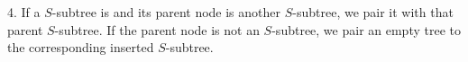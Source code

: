 4. If a $S$-subtree is  and its parent node is another
$S$-subtree, we pair it with that parent $S$-subtree.  If the parent
node is not an $S$-subtree, we pair an empty tree to the corresponding
inserted $S$-subtree.





